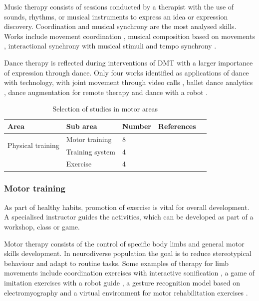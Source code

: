 \documentclass[a4paper,fleqn]{cas-sc}
\begin{document}
Music therapy consists of sessions conducted by a therapist with the use of sounds, rhythms, or musical instruments to express an idea or expression discovery. Coordination and musical synchrony are the most analysed skills. Works include movement coordination \cite{Ragone22, Vargas20}, musical composition based on movements \cite{Ragone20OS, Ma21}, interactional synchrony with musical stimuli \cite{Mcgowan21, McGowan17} and tempo synchrony \cite{Yi-Hsiang18}.


Dance therapy is reflected during interventions of DMT with a larger importance of expression through dance. Only four works identified as applications of dance with technology, with joint movement through video calls \cite{Brown22}, ballet dance analytics \cite{Trajkova20}, dance augmentation for remote therapy \cite{Ringland19} and dance with a robot \cite{Suzuki17}.

\begin{table}[h]
\centering
\begin{center}
\begin{tabular*}{6.2in}{p{0.85in}|p{0.82in}|p{0.35in}|p{3.5in}p{0in}}
\hline
Area   & Sub area   & Number & References  &  \\ \hline
\multirow{2}{*}{Physical training}
    & Motor training & 8 & \cite{Soprani22, Hocking22, Cibrian21, Syahputra21, Santos20, Bansode19, Lee18, Cornejo17}  &  \\  \cline{2-4}
    & Training system   & 4   & \cite{Fassina22, Giraud21, Zhao21, Oprea17}  & 
    \\ \cline{2-4}
    & Exercise  & 4   & \cite{Baharin19, MarquezSegura19, Ardalan19, Bittner17}    &  \\\cline{1-4}
\end{tabular*}
\caption{Selection of studies in motor areas}
\label{TABLE:area-motor}
\end{center}
\end{table}

\subsubsection{Motor training}
\label{sec:app-contexts-motor}
As part of healthy habits, promotion of exercise is vital for overall development. A specialised instructor guides the activities, which can be developed as part of a workshop, class or game.

Motor therapy consists of the control of specific body limbs and general motor skills development. In neurodiverse population the goal is to reduce stereotypical behaviour and adapt to routine tasks. Some examples of therapy for limb movements include coordination exercises with interactive sonification \cite{Cibrian21}, a game of imitation exercises with a robot guide \cite{Santos20}, a gesture recognition model based on electromyography \cite{Syahputra21} and a virtual environment for motor rehabilitation exercises \cite{Soprani22}.
\end{document}
